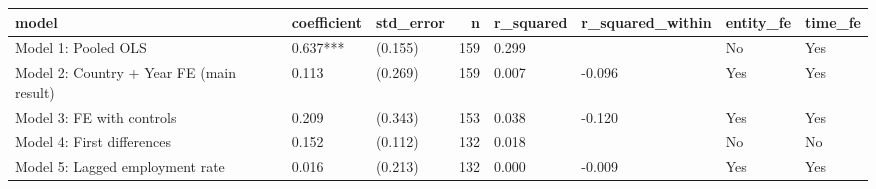 \begin{tabular}{lllrllll}
\toprule
model & coefficient & std\_error & n & r\_squared & r\_squared\_within & entity\_fe & time\_fe \\
\midrule
Model 1: Pooled OLS & 0.637*** & (0.155) & 159 & 0.299 &  & No & Yes \\
Model 2: Country + Year FE (main result) & 0.113 & (0.269) & 159 & 0.007 & -0.096 & Yes & Yes \\
Model 3: FE with controls & 0.209 & (0.343) & 153 & 0.038 & -0.120 & Yes & Yes \\
Model 4: First differences & 0.152 & (0.112) & 132 & 0.018 &  & No & No \\
Model 5: Lagged employment rate & 0.016 & (0.213) & 132 & 0.000 & -0.009 & Yes & Yes \\
\bottomrule
\end{tabular}
